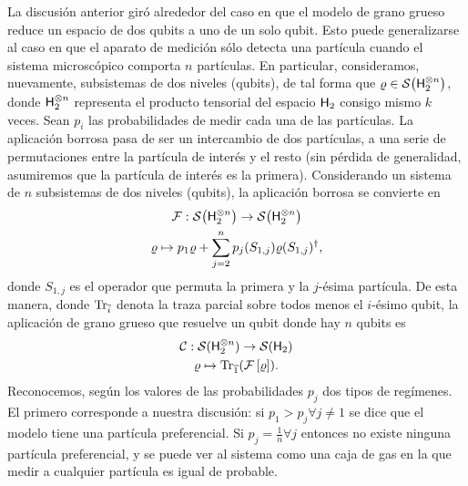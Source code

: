 La discusión anterior giró alrededor del caso en que el modelo de grano grueso reduce un espacio de dos qubits a uno de un solo qubit. Esto puede generalizarse al caso en que el aparato de medición sólo detecta una partícula cuando el sistema microscópico comporta $n$ partículas. En particular, consideramos, nuevamente, subsistemas de dos niveles (qubits), de tal forma que $\varrho\in\mathcal{S}\qty( {\sf H}_{2}^{\otimes n})$, donde ${\sf H}_{2}^{\otimes n}$ representa el producto tensorial del espacio ${\sf H}_{2}$ consigo mismo $k$ veces. Sean $p_{i}$ las probabilidades de medir cada una de las partículas. La aplicación borrosa pasa de ser un intercambio de dos partículas, a una serie de permutaciones entre la partícula de interés y el resto (sin pérdida de generalidad, asumiremos que la partícula de interés es la primera). Considerando un sistema de $n$ subsistemas de dos niveles (qubits), la aplicación borrosa se convierte en
\begin{gather*}
    \mathcal{F}:\mathcal{S}\qty( {\sf H}_{2}^{\otimes n})\to \mathcal{S}\qty( {\sf H}_{2}^{\otimes n})\nonumber\\
    \varrho \mapsto p_{1}\varrho+\sum_{j=2}^{n}p_{j}(S_{1,j})\varrho(S_{1,j})^{\dagger},
\end{gather*}
donde $S_{1,j}$ es el operador que permuta la primera y la $j$-ésima partícula. De esta manera, donde $\Tr_{\overline{i}}$ denota la traza parcial sobre todos menos el $i$-ésimo qubit, la aplicación de grano grueso que resuelve un qubit donde hay $n$ qubits es
\begin{gather}\label{eq:CG}
    \mathcal{C}:\mathcal{S}( {\sf H}_{2}^{\otimes n})\to \mathcal{S}({\sf H}_{2})\nonumber\\
    \varrho\mapsto\Tr_{\overline{1}}(\mathcal{F}\left[\varrho\right]).
\end{gather}
Reconocemos, según los valores de las probabilidades $p_{j}$ dos tipos de regímenes. El primero corresponde a nuestra discusión: si $p_{1}>p_{j}\forall j\neq 1$ se dice que el modelo tiene una partícula preferencial. Si $p_{j}=\frac{1}{n}\forall j$ entonces no existe ninguna partícula preferencial, y se puede ver al sistema como una caja de gas en la que medir a cualquier partícula es igual de probable.